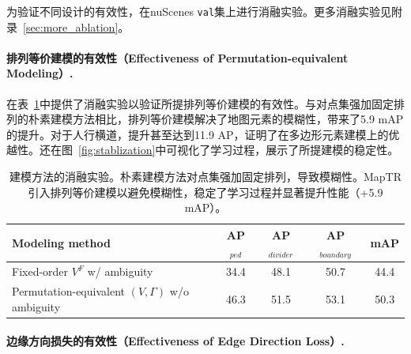 \documentclass{article} %
\begin{document}
为验证不同设计的有效性，在nuScenes \texttt{val}集上进行消融实验。更多消融实验见附录~\ref{sec:more_ablation}。

\paragraph{排列等价建模的有效性（Effectiveness of Permutation-equivalent Modeling）.}
在表~\ref{tab:abla-modeling}中提供了消融实验以验证所提排列等价建模的有效性。与对点集强加固定排列的朴素建模方法相比，排列等价建模解决了地图元素的模糊性，带来了5.9 mAP的提升。对于人行横道，提升甚至达到11.9 AP，证明了在多边形元素建模上的优越性。还在图~\ref{fig:stablization}中可视化了学习过程，展示了所提建模的稳定性。

\begin{table}[ht]
\begin{center}
\begin{tabular}{l|ccc|c}
\hline
\rowcolor{Gray}
Modeling method & AP$_{\textit{ped}}$ & AP$_{\textit{divider}}$ & AP$_{\textit{boundary}}$ & mAP\\
\toprule
Fixed-order $V^F$ w/ ambiguity   &34.4&48.1&50.7&44.4 \\
Permutation-equivalent $(V,\Gamma)$ w/o ambiguity &\cellcolor{blue!10}46.3&\cellcolor{blue!10}51.5&\cellcolor{blue!10}53.1&\cellcolor{blue!10}50.3\\
\bottomrule
\end{tabular}
\end{center}
\vspace*{-0.45cm}
\caption{建模方法的消融实验。朴素建模方法对点集强加固定排列，导致模糊性。MapTR引入排列等价建模以避免模糊性，稳定了学习过程并显著提升性能（+5.9 mAP）。}
\label{tab:abla-modeling}
\vspace*{-0.35cm}
\end{table}


\paragraph{边缘方向损失的有效性（Effectiveness of Edge Direction Loss）.}
\end{document}
